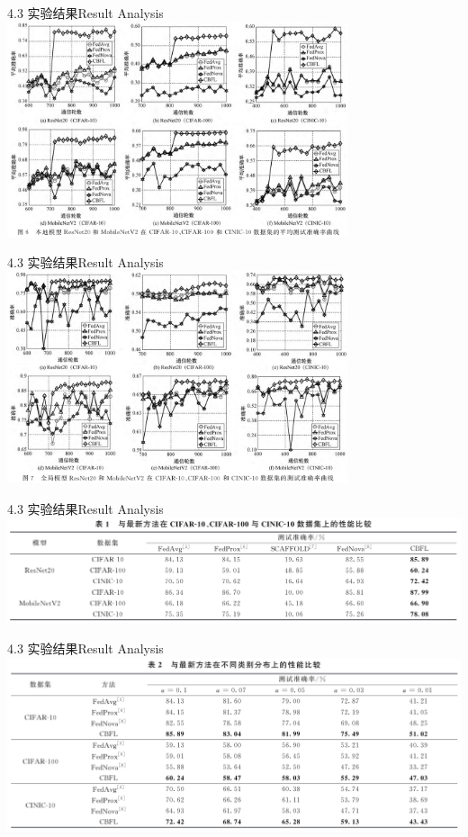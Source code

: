 \documentclass{sintefbeamer}
\theoremstyle{definition}
\begin{document}
\begin{frame}{4.3 实验结果}{Result Analysis}
	\includegraphics[width=0.75\textwidth]{images/img_expr1}
\end{frame}

\begin{frame}{4.3 实验结果}{Result Analysis}
	\includegraphics[width=0.75\textwidth]{images/img_expr3}
\end{frame}

\begin{frame}{4.3 实验结果}{Result Analysis}
	\includegraphics[width=1.\textwidth]{images/img_expr2}
\end{frame}

\begin{frame}{4.3 实验结果}{Result Analysis}
	\includegraphics[width=1.\textwidth]{images/img_expr4}
\end{frame}
\end{document}

